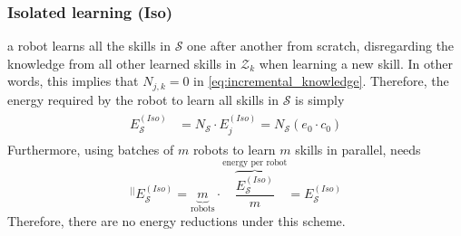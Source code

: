 \subsubsection{\textbf{Isolated learning (Iso)}} a robot learns all the skills in $\mathcal{S}$ one after another from scratch, disregarding the knowledge from all other learned skills in $\mathcal{Z}_k$ when learning a new skill. In other words, this implies that $N_{j,k} = 0$ in \eqref{eq:incremental_knowledge}. Therefore, the energy required by the robot to learn all skills in $\mathcal{S}$ is simply
\begin{align}
    \begin{split}
      E^{(Iso)}_{\mathcal{S}} &= N_{\mathcal{S}} \cdot E^{(Iso)}_j = N_{\mathcal{S}} \left(  e_{0} \cdot c_0 \right)
    \end{split}
\end{align}
Furthermore, using batches of $m$ robots to learn $m$ skills in parallel, needs 
\begin{equation}
    ^{\lvert \lvert}E^{(Iso)}_\mathcal{S}= \underbrace{m}_{\text{robots}}\cdot \overbrace{\frac{E^{(Iso)}_\mathcal{S}}{m}}^{\text{energy per robot}} = E^{(Iso)}_\mathcal{S}
\end{equation}
Therefore, there are no energy reductions under this scheme.

